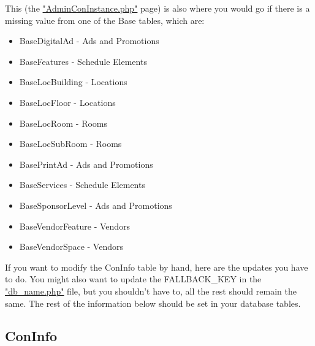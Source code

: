 \documentclass[captions=tablesignature]{scrartcl}
\begin{document}
This (the \href{../webpages/AdminConInstance.php}{"AdminConInstance.php"} page) is also where you would go if
there is a missing value from one of the Base tables, which are:
\begin{itemize}
\item BaseDigitalAd - Ads and Promotions
\item BaseFeatures - Schedule Elements
\item BaseLocBuilding - Locations
\item BaseLocFloor - Locations
\item BaseLocRoom - Rooms
\item BaseLocSubRoom - Rooms
\item BasePrintAd - Ads and Promotions
\item BaseServices - Schedule Elements
\item BaseSponsorLevel - Ads and Promotions
\item BaseVendorFeature - Vendors
\item BaseVendorSpace - Vendors
\end{itemize}

If you want to modify the ConInfo table by hand, here are the
updates you have to do.  You might also want to update the
FALLBACK\_KEY in the \href{../Local/db_name.php}{"db\_name.php"} file, but you shouldn't have
to, all the rest should remain the same.  The rest of the
information below should be set in your database tables.
\subsection{ConInfo}
\label{sec-11-1}
\end{document}
